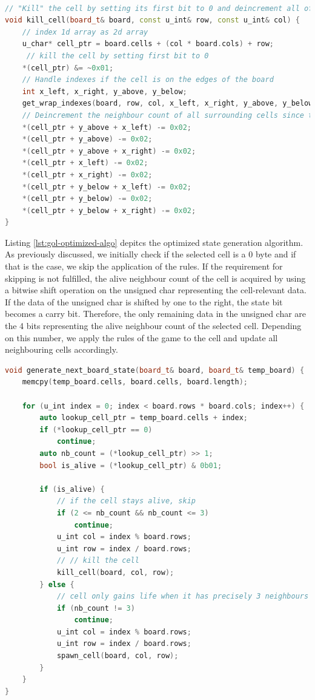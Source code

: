 \documentclass[a4paper,english,12pt,twoside=false]{scrartcl} %
\begin{document}
\begin{lstlisting}[caption={Parallel Naive State Generation Algorithm},label={lst:gol-optimized-manipulation},language=C++]

// "Kill" the cell by setting its first bit to 0 and deincrement all of its 8 neighbours living cell counts by one
void kill_cell(board_t& board, const u_int& row, const u_int& col) {
    // index 1d array as 2d array
    u_char* cell_ptr = board.cells + (col * board.cols) + row;
     // kill the cell by setting first bit to 0
    *(cell_ptr) &= ~0x01;
    // Handle indexes if the cell is on the edges of the board
    int x_left, x_right, y_above, y_below;
    get_wrap_indexes(board, row, col, x_left, x_right, y_above, y_below);
    // Deincrement the neighbour count of all surrounding cells since the cell died
    *(cell_ptr + y_above + x_left) -= 0x02;
    *(cell_ptr + y_above) -= 0x02;
    *(cell_ptr + y_above + x_right) -= 0x02;
    *(cell_ptr + x_left) -= 0x02;
    *(cell_ptr + x_right) -= 0x02;
    *(cell_ptr + y_below + x_left) -= 0x02;
    *(cell_ptr + y_below) -= 0x02;
    *(cell_ptr + y_below + x_right) -= 0x02;
}
\end{lstlisting}

Listing \ref{lst:gol-optimized-algo} depitcs the optimized state generation algorithm. As previously discussed, we initially check if the selected cell is a 0 byte and if that is the case, we skip the application of the rules. If the requirement for skipping is not fulfilled, the alive neighbour count of the cell is acquired by using a bitwise shift operation on the unsigned char representing the cell-relevant data. If the data of the unsigned char is shifted by one to the right, the state bit becomes a carry bit. Therefore, the only remaining data in the unsigned char are the 4 bits representing the alive neighbour count of the selected cell. Depending on this number, we apply the rules of the game to the cell and update all neighbouring cells accordingly.

\begin{lstlisting}[caption={Parallel Naive State Generation Algorithm},label={lst:gol-optimized-algo},language=C++]
void generate_next_board_state(board_t& board, board_t& temp_board) {
    memcpy(temp_board.cells, board.cells, board.length);

    for (u_int index = 0; index < board.rows * board.cols; index++) {
        auto lookup_cell_ptr = temp_board.cells + index;
        if (*lookup_cell_ptr == 0)
            continue;
        auto nb_count = (*lookup_cell_ptr) >> 1;
        bool is_alive = (*lookup_cell_ptr) & 0b01;

        if (is_alive) {
            // if the cell stays alive, skip
            if (2 <= nb_count && nb_count <= 3)
                continue;
            u_int col = index % board.rows;
            u_int row = index / board.rows;
            // // kill the cell
            kill_cell(board, col, row);
        } else {
            // cell only gains life when it has precisely 3 neighbours
            if (nb_count != 3)
                continue;
            u_int col = index % board.rows;
            u_int row = index / board.rows;
            spawn_cell(board, col, row);
        }
    }
}
\end{lstlisting}
\end{document}
